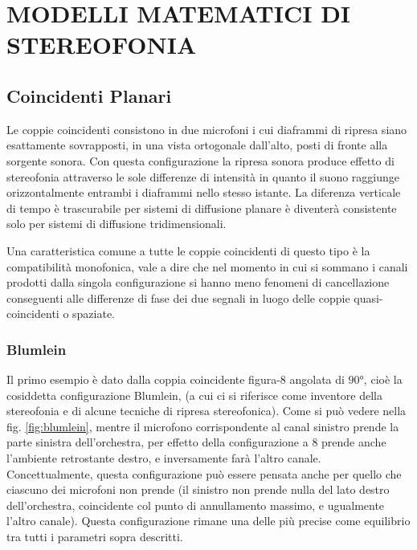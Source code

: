 \section*{MODELLI MATEMATICI DI\\ STEREOFONIA}

\subsection*{Coincidenti Planari}
Le coppie coincidenti consistono in due microfoni i cui diaframmi di ripresa
siano esattamente sovrapposti, in una vista ortogonale dall’alto, posti di
fronte alla sorgente sonora. Con questa configurazione la ripresa sonora produce
effetto di stereofonia attraverso le sole differenze di intensità in quanto il
suono raggiunge orizzontalmente entrambi i diaframmi nello stesso istante.
La diferenza verticale di tempo è trascurabile per sistemi di diffusione planare
è diventerà consistente solo per sistemi di diffusione tridimensionali.

Una caratteristica comune a tutte le coppie coincidenti di questo tipo è la
compatibilità monofonica, vale a dire che nel momento in cui si sommano i canali
prodotti dalla singola configurazione si hanno meno fenomeni di cancellazione
conseguenti alle differenze di fase dei due segnali in luogo delle coppie
quasi-coincidenti o spaziate.
\subsubsection*{Blumlein}
Il primo esempio è dato dalla coppia coincidente figura-8 angolata di $90°$,
cioè la cosiddetta configurazione Blumlein, (a cui ci si riferisce come
inventore della stereofonia e di alcune tecniche di ripresa stereofonica). Come
si può vedere nella fig. \ref{fig:blumlein}, mentre il microfono corrispondente al canal
sinistro prende la parte sinistra dell’orchestra, per effetto della configurazione
a 8 prende anche l’ambiente retrostante destro, e inversamente farà l’altro canale.
Concettualmente, questa configurazione può essere pensata anche per quello che
ciascuno dei microfoni non prende (il sinistro non prende nulla del lato destro
dell’orchestra, coincidente col punto di annullamento massimo, e ugualmente
l’altro canale). Questa configurazione rimane una delle più precise come
equilibrio tra tutti i parametri sopra descritti.

